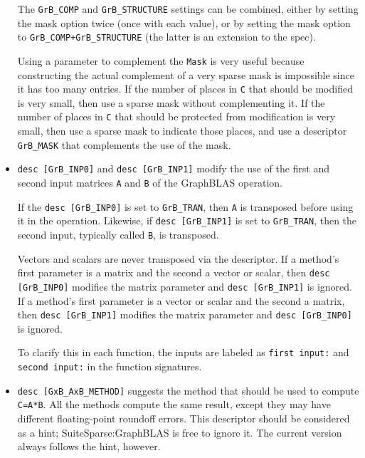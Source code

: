 \documentclass[12pt]{article}
\begin{document}
\begin{itemize}
    The \verb'GrB_COMP' and \verb'GrB_STRUCTURE' settings can be combined,
    either by setting the mask option twice (once with each value), or by
    setting the mask option to \verb'GrB_COMP+GrB_STRUCTURE' (the latter is an
    extension to the spec).

    Using a parameter to complement the \verb'Mask' is very useful because
    constructing the actual complement of a very sparse mask is impossible
    since it has too many entries.  If the number of places in \verb'C'
    that should be modified is very small, then use a sparse mask without
    complementing it.  If the number of places in \verb'C' that should
    be protected from modification is very small, then use a sparse mask
    to indicate those places, and use a descriptor \verb'GrB_MASK' that
    complements the use of the mask.

\item \verb'desc [GrB_INP0]' and \verb'desc [GrB_INP1]' modify the use of the
    first and second input matrices \verb'A' and \verb'B' of the GraphBLAS
    operation.

    If the \verb'desc [GrB_INP0]' is set to \verb'GrB_TRAN', then \verb'A' is
    transposed before using it in the operation.  Likewise, if
    \verb'desc [GrB_INP1]' is set to \verb'GrB_TRAN', then the second input,
    typically called \verb'B', is transposed.

    Vectors and scalars are never transposed via the descriptor.  If a method's
    first parameter is a matrix and the second a vector or scalar, then
    \verb'desc [GrB_INP0]' modifies the matrix parameter and
    \verb'desc [GrB_INP1]' is ignored.  If a method's first parameter is a
    vector or scalar and the second a matrix, then \verb'desc [GrB_INP1]'
    modifies the matrix parameter and \verb'desc [GrB_INP0]' is ignored.

    To clarify this in each function, the inputs are labeled as
    \verb'first input:' and \verb'second input:' in the function signatures.

\item \verb'desc [GxB_AxB_METHOD]' suggests the method that should be
    used to compute \verb'C=A*B'.  All the methods compute the same result,
    except they may have different floating-point roundoff errors.  This
    descriptor should be considered as a hint; SuiteSparse:GraphBLAS is
    free to ignore it.  The current version always follows the hint, however.

    \begin{itemize}


\end{itemize}
\end{itemize}
\end{document}
